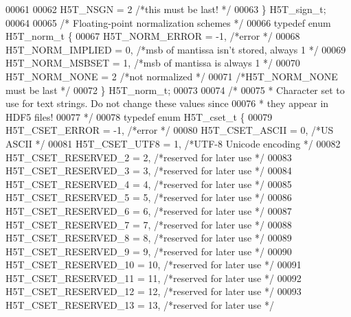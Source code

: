\begin{DoxyCode}
00061 
00062     H5T\_NSGN             = 2    \textcolor{comment}{/*this must be last!                         */}
00063 \} H5T\_sign\_t;
00064 
00065 \textcolor{comment}{/* Floating-point normalization schemes */}
00066 \textcolor{keyword}{typedef} \textcolor{keyword}{enum} H5T\_norm\_t \{
00067     H5T\_NORM\_ERROR       = -1,  \textcolor{comment}{/*error                                      */}
00068     H5T\_NORM\_IMPLIED     = 0,   \textcolor{comment}{/*msb of mantissa isn't stored, always 1     */}
00069     H5T\_NORM\_MSBSET      = 1,   \textcolor{comment}{/*msb of mantissa is always 1                */}
00070     H5T\_NORM\_NONE        = 2    \textcolor{comment}{/*not normalized                             */}
00071     \textcolor{comment}{/*H5T\_NORM\_NONE must be last */}
00072 \} H5T\_norm\_t;
00073 
00074 \textcolor{comment}{/*}
00075 \textcolor{comment}{ * Character set to use for text strings.  Do not change these values since}
00076 \textcolor{comment}{ * they appear in HDF5 files!}
00077 \textcolor{comment}{ */}
00078 \textcolor{keyword}{typedef} \textcolor{keyword}{enum} H5T\_cset\_t \{
00079     H5T\_CSET\_ERROR       = -1,  \textcolor{comment}{/*error                                      */}
00080     H5T\_CSET\_ASCII       = 0,   \textcolor{comment}{/*US ASCII                                   */}
00081     H5T\_CSET\_UTF8        = 1,   \textcolor{comment}{/*UTF-8 Unicode encoding             */}
00082     H5T\_CSET\_RESERVED\_2  = 2,   \textcolor{comment}{/*reserved for later use             */}
00083     H5T\_CSET\_RESERVED\_3  = 3,   \textcolor{comment}{/*reserved for later use             */}
00084     H5T\_CSET\_RESERVED\_4  = 4,   \textcolor{comment}{/*reserved for later use             */}
00085     H5T\_CSET\_RESERVED\_5  = 5,   \textcolor{comment}{/*reserved for later use             */}
00086     H5T\_CSET\_RESERVED\_6  = 6,   \textcolor{comment}{/*reserved for later use             */}
00087     H5T\_CSET\_RESERVED\_7  = 7,   \textcolor{comment}{/*reserved for later use             */}
00088     H5T\_CSET\_RESERVED\_8  = 8,   \textcolor{comment}{/*reserved for later use             */}
00089     H5T\_CSET\_RESERVED\_9  = 9,   \textcolor{comment}{/*reserved for later use             */}
00090     H5T\_CSET\_RESERVED\_10 = 10,  \textcolor{comment}{/*reserved for later use             */}
00091     H5T\_CSET\_RESERVED\_11 = 11,  \textcolor{comment}{/*reserved for later use             */}
00092     H5T\_CSET\_RESERVED\_12 = 12,  \textcolor{comment}{/*reserved for later use             */}
00093     H5T\_CSET\_RESERVED\_13 = 13,  \textcolor{comment}{/*reserved for later use             */}

\end{DoxyCode}
